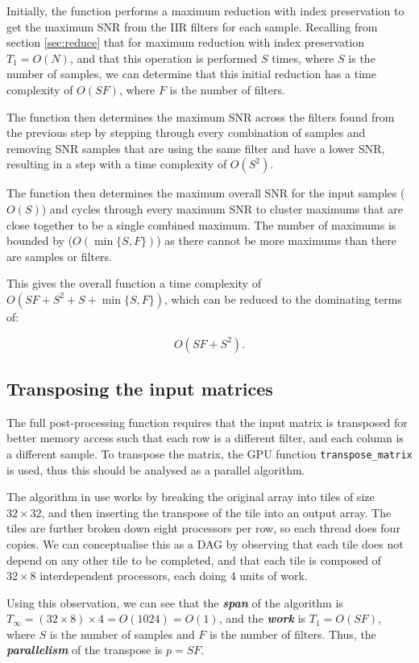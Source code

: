\documentclass{article}
\begin{document}
Initially, the function performs a maximum reduction with index preservation to get the maximum SNR from the IIR filters for each sample.
Recalling from section \ref{sec:reduce} that for maximum reduction with index preservation \(T_1 = O(N)\), and that this operation is performed \(S\) times, where \(S\) is the number of samples, we can determine that this initial reduction has a time complexity of 
\(O(SF)\), where \(F\) is the number of filters.

The function then determines the maximum SNR across the filters found from the previous step by stepping through every combination of samples and removing SNR samples that are using the same filter and have a lower SNR, resulting in a step with a time complexity of \(O(S^2)\).

The function then determines the maximum overall SNR for the input samples (\(O(S)\)) and cycles through every maximum SNR to cluster maximums that are close together to be a single combined maximum.
The number of maximums is bounded by (\(O(\min\{S,F\})\)) as there cannot be more maximums than there are samples or filters.

This gives the overall function a time complexity of \(O(SF + S^2 + S + \min\{S,F\})\), which can be reduced to the dominating terms of:

\[
    O(SF + S^2).
\]

\subsection{Transposing the input matrices} \label{sec:transpose}

The full post-processing function requires that the input matrix is transposed for better memory access such that each row is a different filter, and each column is a different sample.
To transpose the matrix, the GPU function \texttt{transpose\_matrix} is used, thus this should be analysed as a parallel algorithm.

The algorithm in use works by breaking the original array into tiles of size \(32\times32\), and then inserting the transpose of the tile into an output array.
The tiles are further broken down eight processors per row, so each thread does four copies.
We can conceptualise this as a DAG by observing that each tile does not depend on any other tile to be completed, and that each tile is composed of \(32\times8\) interdependent processors, each doing 4 units of work.

Using this observation, we can see that the \textit{\textbf{span}} of the algorithm is \(T_\infty = (32\times8)\times4 = O(1024) = O(1)\), and the \textit{\textbf{work}} is \(T_1 = O(SF)\), where \(S\) is the number of samples and \(F\) is the number of filters.
Thus, the \textit{\textbf{parallelism}} of the transpose is \(p = SF\).
\end{document}
